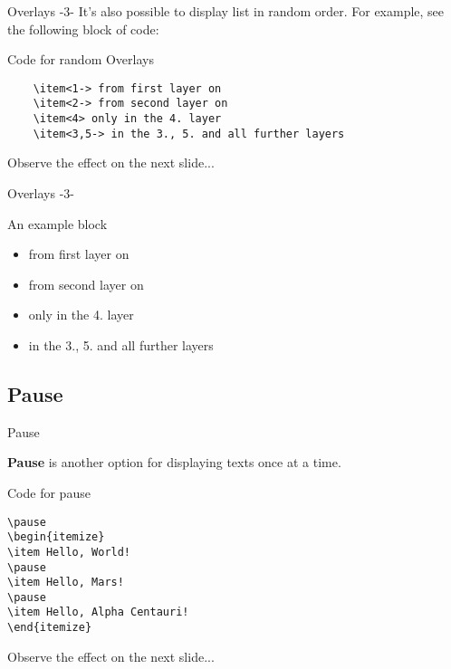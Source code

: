 \documentclass[10pt,xcolor=x11names]{beamer}
\begin{document}
\begin{frame}[fragile]{Overlays -3-} \vspace{-20pt}
It's also possible to display list in random order. For example, see the following block of code:
\begin{exampleblock}{ Code for random Overlays}
	\begin{verbatim}
	\item<1-> from first layer on
	\item<2-> from second layer on
	\item<4> only in the 4. layer
	\item<3,5-> in the 3., 5. and all further layers
	\end{verbatim}	
\end{exampleblock} \vspace{10pt}
Observe the effect on the next slide...
\end{frame}

\begin{frame}{Overlays -3-}\vspace{-80pt}
\begin{exampleblock}{An example block}
	\begin{itemize}
		\item<1-> from first layer on
		\item<2-> from second layer on
		\item<4> only in the 4. layer
		\item<3,5-> in the 3., 5. and all further layers
	\end{itemize}
\end{exampleblock}
\end{frame}


\subsection{Pause}

\begin{frame}[fragile]{Pause} \vspace{-20pt}

\alert{\textbf{Pause}} is another option for displaying texts once at a time.   

\begin{exampleblock}{Code for pause}
	\begin{verbatim}
\pause
\begin{itemize}
\item Hello, World!
\pause
\item Hello, Mars!
\pause
\item Hello, Alpha Centauri!
\end{itemize}
	\end{verbatim}	
\end{exampleblock}
\vspace{10pt}
Observe the effect on the next slide...

\end{frame}
\end{document}
